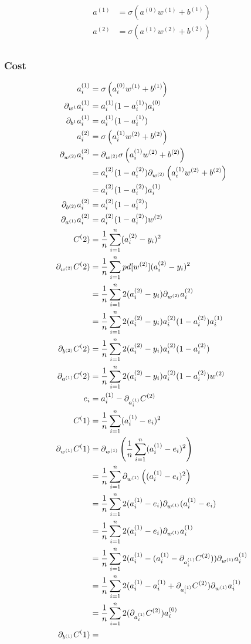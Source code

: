 \documentclass{article}
\begin{document}
\begin{align}
	a^{(1)} &= \sigma\left(a^{(0)}w^{(1)} + b^{(1)}\right) \\	
	a^{(2)} &= \sigma\left(a^{(1)}w^{(2)} + b^{(2)}\right) \\
\end{align}

\subsubsection{Cost}

\begin{align}
	a_i^{(1)} &= \sigma\left(a_i^{(0)}w^{(1)} + b^{(1)}\right) \\	
	\pd[w^{1}]a_i^{(1)} 
		&= a_i^{(1)}(1 - a_i^{(1)}) a_i^{(0)}\\ 
	\pd[b^{1}]a_i^{(1)} 
		&= a_i^{(1)}(1 - a_i^{(1)}) \\ 
	a_i^{(2)} &= \sigma\left(a_i^{(1)}w^{(2)} + b^{(2)}\right) \\
	\pd[w^{(2)}]a_i^{(2)} 
		&= \pd[w^{(2)}] \sigma\left(a_i^{(1)}w^{(2)} + b^{(2)}\right) \\	
		&= a_i^{(2)}(1 - a_i^{(2)}) \pd[w^{(2)}] \left(a_i^{(1)}w^{(2)} + b^{(2)}\right) \\	
		&= a_i^{(2)}(1 - a_i^{(2)}) a_i^{(1)} \\	
	\pd[b^{(2)}]a_i^{(2)} 
		&= a_i^{(2)}(1 - a_i^{(2)}) \\	
	\pd[a^{(1)}]a_i^{(2)} 
		&= a_i^{(2)}(1 - a_i^{(2)})w^{(2)} \\	
	C^(2) &= \avgsum[i, n] (a_i^{(2)} - y_i)^2 \\
	\pd[w^{(2)}]C^(2)  
		&= \avgsum[i, n] pd[w^{(2)}](a_i^{(2)} - y_i)^2 \\
		&= \avgsum[i, n] 2(a_i^{(2)} - y_i) \pd[w^{(2)}]a_i^{(2)} \\
		&= \avgsum[i, n] 2(a_i^{(2)} - y_i) a_i^{(2)}(1 - a_i^{(2)}) a_i^{(1)} \\
	\pd[b^{(2)}]C^(2)  
		&= \avgsum[i, n] 2(a_i^{(2)} - y_i) a_i^{(2)}(1 - a_i^{(2)}) \\
	\pd[a^{(1)}]C^(2)  
		&= \avgsum[i, n] 2(a_i^{(2)} - y_i) a_i^{(2)}(1 - a_i^{(2)}) w^{(2)} \\
	e_i &= a_i^{(1)} - \pd[a_i^{(1)}]C^{(2)} \\
	C^(1) &= \avgsum[i, n] (a_i^{(1)} - e_i)^2 \\
	\pd[w^{(1)}]C^(1)  
		&= \pd[w^{(1)}]\left(\avgsum[i, n] (a_i^{(1)} - e_i)^2\right) \\
		&= \avgsum[i, n] \pd[w^{(1)}]\left((a_i^{(1)} - e_i)^2\right) \\
		&= \avgsum[i, n] 2(a_i^{(1)} - e_i)\pd[w^{(1)}](a_i^{(1)} - e_i) \\
		&= \avgsum[i, n] 2(a_i^{(1)} - e_i)\pd[w^{(1)}]a_i^{(1)} \\
		&= \avgsum[i, n] 2(a_i^{(1)} - (a_i^{(1)} - \pd[a_i^{(1)}]C^{(2)}))\pd[w^{(1)}]a_i^{(1)} \\
		&= \avgsum[i, n] 2(a_i^{(1)} - a_i^{(1)} + \pd[a_i^{(1)}]C^{(2)})\pd[w^{(1)}]a_i^{(1)} \\
		&= \avgsum[i, n] 2(\pd[a_i^{(1)}]C^{(2)}) a_i^{(0)} \\
	\pd[b^{(1)}]C^(1)  
		&= \\
\end{align}
\end{document}
